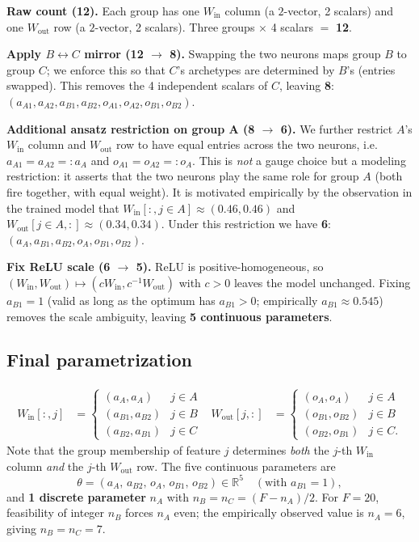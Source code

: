 \documentclass[11pt]{article}
\begin{document}
\textbf{Raw count (12).} Each group has one $W_{\mathrm{in}}$ column (a $2$-vector, 2 scalars) and one $W_{\mathrm{out}}$ row (a $2$-vector, 2 scalars). Three groups $\times$ 4 scalars $=$ \textbf{12}.

\textbf{Apply $B \leftrightarrow C$ mirror (12 $\to$ 8).} Swapping the two neurons maps group $B$ to group $C$; we enforce this so that $C$'s archetypes are determined by $B$'s (entries swapped). This removes the 4 independent scalars of $C$, leaving \textbf{8}: $(a_{A1}, a_{A2}, a_{B1}, a_{B2}, o_{A1}, o_{A2}, o_{B1}, o_{B2})$.

\textbf{Additional ansatz restriction on group A (8 $\to$ 6).} We further restrict $A$'s $W_{\mathrm{in}}$ column and $W_{\mathrm{out}}$ row to have equal entries across the two neurons, i.e.\ $a_{A1} = a_{A2} =: a_A$ and $o_{A1} = o_{A2} =: o_A$. This is \emph{not} a gauge choice but a modeling restriction: it asserts that the two neurons play the same role for group $A$ (both fire together, with equal weight). It is motivated empirically by the observation in the trained model that $W_{\mathrm{in}}[:, j \in A] \approx (0.46, 0.46)$ and $W_{\mathrm{out}}[j \in A, :] \approx (0.34, 0.34)$. Under this restriction we have \textbf{6}: $(a_A, a_{B1}, a_{B2}, o_A, o_{B1}, o_{B2})$.

\textbf{Fix ReLU scale (6 $\to$ 5).} ReLU is positive-homogeneous, so $(W_{\mathrm{in}}, W_{\mathrm{out}}) \mapsto (c W_{\mathrm{in}}, c^{-1} W_{\mathrm{out}})$ with $c > 0$ leaves the model unchanged. Fixing $a_{B1} = 1$ (valid as long as the optimum has $a_{B1} > 0$; empirically $a_{B1} \approx 0.545$) removes the scale ambiguity, leaving \textbf{5 continuous parameters}.

\subsection*{Final parametrization}

\begin{align*}
W_{\mathrm{in}}[:, j] &=
\begin{cases}
(a_A, a_A) & j \in A \\
(a_{B1}, a_{B2}) & j \in B \\
(a_{B2}, a_{B1}) & j \in C
\end{cases}
&
W_{\mathrm{out}}[j, :] &=
\begin{cases}
(o_A, o_A) & j \in A \\
(o_{B1}, o_{B2}) & j \in B \\
(o_{B2}, o_{B1}) & j \in C.
\end{cases}
\end{align*}
Note that the group membership of feature $j$ determines \emph{both} the $j$-th $W_{\mathrm{in}}$ column \emph{and} the $j$-th $W_{\mathrm{out}}$ row. The five continuous parameters are
\begin{equation*}
\theta = (a_A, \, a_{B2}, \, o_A, \, o_{B1}, \, o_{B2}) \in \mathbb{R}^5 \quad (\text{with } a_{B1} = 1),
\end{equation*}
and \textbf{1 discrete parameter} $n_A$ with $n_B = n_C = (F - n_A)/2$. For $F = 20$, feasibility of integer $n_B$ forces $n_A$ even; the empirically observed value is $n_A = 6$, giving $n_B = n_C = 7$.
\end{document}

